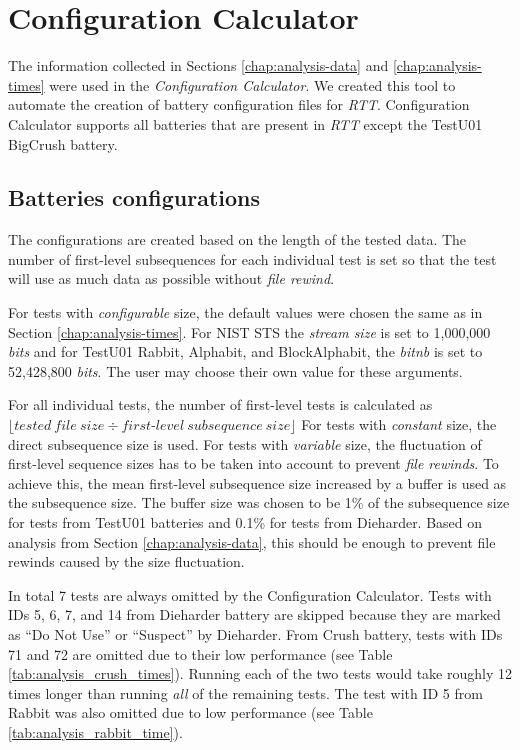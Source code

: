 \documentclass[
  digital,     %
  oneside,     %
  nosansbold,  %
  nocolorbold, %
  nolof,         %
  nolot,         %
]{fithesis4}
\begin{document}

\section{Configuration Calculator} \label{chap:analysis-config-calc}

The information collected in Sections \ref{chap:analysis-data} and \ref{chap:analysis-times} were used in the \emph{Configuration Calculator}. We created this tool to automate the creation of battery configuration files for \emph{RTT}. Configuration Calculator supports all batteries that are present in \emph{RTT} except the TestU01 BigCrush battery.

\subsection{Batteries configurations}

The configurations are created based on the length of the tested data. The number of first-level subsequences for each individual test is set so that the test will use as much data as possible without \emph{file rewind}.

For tests with \emph{configurable} size, the default values were chosen the same as in Section \ref{chap:analysis-times}. For NIST STS the \emph{stream size} is set to 1,000,000 \emph{bits} and for TestU01 Rabbit, Alphabit, and BlockAlphabit, the \emph{bit\textunderscore nb} is set to  52,428,800 \emph{bits}. The user may choose their own value for these arguments.

For all individual tests, the number of first-level tests is calculated as 
$\lfloor tested\:file\:size \div first\mbox{-}level\:subsequence\:size\rfloor$
For tests with \emph{constant} size, the direct subsequence size is used. For tests with \emph{variable} size, the fluctuation of first-level sequence sizes has to be taken into account to prevent \emph{file rewinds}. To achieve this, the mean first-level subsequence size increased by a buffer is used as the subsequence size. The buffer size was chosen to be 1\% of the subsequence size for tests from TestU01 batteries and 0.1\% for tests from Dieharder. Based on analysis from Section \ref{chap:analysis-data}, this should be enough to prevent file rewinds caused by the size fluctuation.

In total 7 tests are always omitted by the Configuration Calculator. Tests with IDs 5, 6, 7, and 14 from Dieharder battery are skipped because they are marked as ``Do Not Use'' or ``Suspect'' by Dieharder. From Crush battery, tests with IDs 71 and 72 are omitted due to their low performance (see Table \ref{tab:analysis_crush_times}). Running each of the two tests would take roughly 12 times longer than running \emph{all} of the remaining tests. The test with ID 5 from Rabbit was also omitted due to low performance (see Table \ref{tab:analysis_rabbit_time}).
\end{document}
